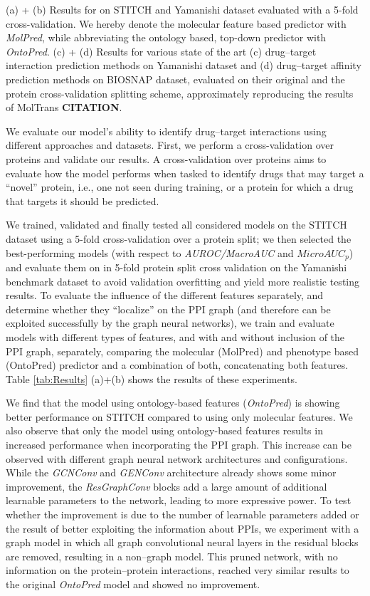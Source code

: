 \documentclass{bioinfo}
\begin{document}
\begin{table}[!tpb]
	\caption{(a) + (b) Results for \name on STITCH and Yamanishi dataset evaluated with a 5-fold cross-validation. We hereby denote the molecular feature based predictor with \textit{MolPred}, while abbreviating the ontology based, top-down predictor with \textit{OntoPred}. (c) + (d) Results for various state of the art (c) drug--target interaction prediction methods on Yamanishi dataset and (d) drug--target affinity prediction methods on BIOSNAP dataset, evaluated on their original and the protein cross-validation splitting scheme, approximately reproducing the results of MolTrans \textbf{CITATION}.}
	\label{tab:Results}
\end{table}

We evaluate our model's ability to identify drug--target interactions
using different approaches and datasets. First, we perform a
cross-validation over proteins and validate our results. A
cross-validation over proteins aims to evaluate how the model performs
when tasked to identify drugs that may target a ``novel'' protein,
i.e., one not seen during training, or a protein for which a drug that
targets it should be predicted. 

We trained, validated and finally tested all considered models on the
STITCH dataset using a 5-fold cross-validation over a protein
split; we then selected the best-performing models (with respect to
\textit{AUROC/MacroAUC} and $MicroAUC_p$) and evaluate them on in 5-fold protein split cross validation on the Yamanishi benchmark dataset to avoid validation overfitting and yield more realistic testing results. To evaluate the influence of the different
features separately, and determine whether they ``localize'' on the
PPI graph (and therefore can be exploited successfully by the graph
neural networks), we train and evaluate models with different types of
features, and with and without inclusion of the PPI graph,
separately, comparing the molecular (MolPred) and phenotype based (OntoPred) predictor and a combination of both, concatenating both features.
Table \ref{tab:Results} (a)+(b) shows the results of these experiments.


We find that the model using ontology-based features
(\textit{OntoPred}) is showing better performance on STITCH compared
to using only molecular features. We also observe that only the model
using ontology-based features results in increased performance when
incorporating the PPI graph. This increase can be observed with
different graph neural network architectures and configurations. While
the {\em GCNConv} and {\em GENConv} architecture already shows some
minor improvement, the \textit{ResGraphConv} blocks add a large amount
of additional learnable parameters to the network, leading to more
expressive power. To test whether the improvement is due to the number
of learnable parameters added or the result of better exploiting the
information about PPIs, we experiment with a graph model in which all
graph convolutional neural layers in the residual blocks are removed,
resulting in a non--graph model. This pruned network, with no
information on the protein--protein interactions, reached very similar
results to the original \textit{OntoPred} model and showed no
improvement.
\end{document}
